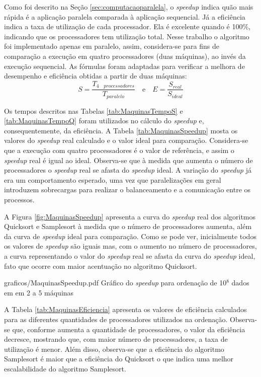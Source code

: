 Como foi descrito na Seção \ref{sec:computacaoparalela}, o \textit{speedup} indica quão mais rápida
é a aplicação paralela comparada à aplicação sequencial. Já a eficiência  indica a taxa de
utilização de cada processador. Ela é  excelente quando é 100\%, indicando que os processadores tem
utilização total.
Nesse trabalho o algoritmo foi implementado apenas em paralelo, assim, considera-se para fins de
comparação a execução em quatro processadores (duas máquinas), ao invés da execução sequencial. As
fórmulas
foram adaptadas para verificar a melhora de desempenho e eficiência obtidas a partir de duas
máquinas: 
\[ S = \frac{T_{4 \quad processadores}}{T_{paralelo}}  
\quad\mbox{e}\quad
 E = \frac{S_{real}}{S_{ideal}}\]

Os tempos descritos nas Tabelas \ref{tab:MaquinasTempoS} e \ref{tab:MaquinasTempoQ} foram
utilizados no cálculo do \textit{speedup} e, consequentemente, da eficiência.
A Tabela \ref{tab:MaquinasSpeedup} mosta os valores do \textit{speedup} real calculado e o valor
ideal para comparação. 
Considera-se que a execução com quatro processadores é o valor de referência, e assim
o \textit{speedup} real é igual ao ideal. 
Observa-se que à medida que aumenta o número de processadores o \textit{speedup} real se afasta do
\textit{speedup} ideal. 
A variação do \textit{speedup} já era um comportamento esperado, uma vez que paralelizações em geral
introduzem sobrecargas para realizar o balanceamento e a comunicação entre os processos.




A Figura \ref{fig:MaquinasSpeedup} apresenta a curva do \textit{speedup} real dos algoritmos
Quicksort e Samplesort à medida que o número de processadores aumenta, além  da curva de
\textit{speedup} ideal para comparação. 
Como se pode ver, inicialmente todos os valores de \textit{speedup} são iguais mas, com o aumento no número de processadores, a curva representando o valor do \textit{speedup} real se afasta da curva
do \textit{speedup} ideal, fato que ocorre com maior acentuação no algoritmo Quicksort.


\begin{defaultFigure}{0.75\textwidth}{graficos/MaquinasSpeedup.pdf}
{Gráfico do \textit{speedup} para ordenação de 10$^8$ dados em em 2 a 5 máquinas}
\label{fig:MaquinasSpeedup}
\end{defaultFigure}

A Tabela \ref{tab:MaquinasEficiencia} apresenta os valores de eficiência calculados para as
diferentes quantidades de processadores utilizados na ordenação. Observa-se que, conforme aumenta a
quantidade de processadores, o valor da eficiência decresce, mostrando que, com maior número de
processadores, a taxa de utilização é menor. Além disso, observa-se que a eficiência
do algoritmo Samplesort é maior que a eficiência do Quicksort o que indica uma melhor escalabilidade
do algoritmo Samplesort. 

